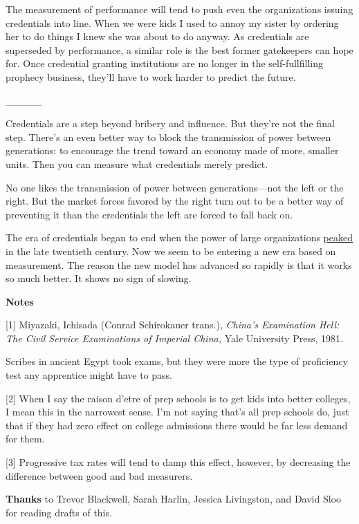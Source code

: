 The measurement of performance will tend to push even the organizations
issuing credentials into line. When we were kids I used to annoy my
sister by ordering her to do things I knew she was about to do anyway.
As credentials are superseded by performance, a similar role is the best
former gatekeepers can hope for. Once credential granting institutions
are no longer in the self-fullfilling prophecy business, they'll have to
work harder to predict the future.

\_\_\_\_\_

Credentials are a step beyond bribery and influence. But they're not the
final step. There's an even better way to block the transmission of
power between generations: to encourage the trend toward an economy made
of more, smaller units. Then you can measure what credentials merely
predict.

No one likes the transmission of power between generations---not the
left or the right. But the market forces favored by the right turn out
to be a better way of preventing it than the credentials the left are
forced to fall back on.

The era of credentials began to end when the power of large
organizations \href{highres.html}{peaked} in the late twentieth century.
Now we seem to be entering a new era based on measurement. The reason
the new model has advanced so rapidly is that it works so much better.
It shows no sign of slowing.

\textbf{Notes}

{[}1{]} Miyazaki, Ichisada (Conrad Schirokauer trans.), \emph{China's
Examination Hell: The Civil Service Examinations of Imperial China,}
Yale University Press, 1981.

Scribes in ancient Egypt took exams, but they were more the type of
proficiency test any apprentice might have to pass.

{[}2{]} When I say the raison d'etre of prep schools is to get kids into
better colleges, I mean this in the narrowest sense. I'm not saying
that's all prep schools do, just that if they had zero effect on college
admissions there would be far less demand for them.

{[}3{]} Progressive tax rates will tend to damp this effect, however, by
decreasing the difference between good and bad measurers.

\textbf{Thanks} to Trevor Blackwell, Sarah Harlin, Jessica Livingston,
and David Sloo for reading drafts of this.
